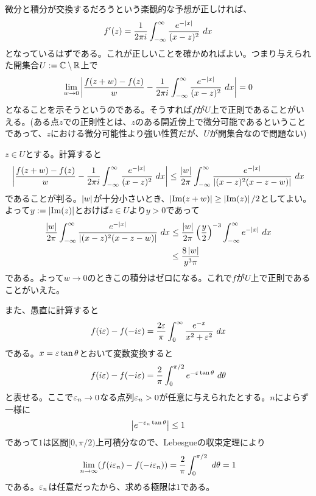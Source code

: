 \subsubsection{}%
\begin{sol}
微分と積分が交換するだろうという楽観的な予想が正しければ、
\[
f'(z) = \frac{1}{2 \pi i} \int_{- \infty}^{\infty} \frac{ e^{- \left \lvert x \right \rvert }  }{ (x - z )^2} \ dx
\]
となっているはずである。これが正しいことを確かめればよい。つまり与えられた開集合$U := {\mathbb C} \setminus {\mathbb R}$上で
\[
\lim_{w \to 0} \left \lvert  \frac{ f(z + w)-f(z) }{w} - \frac{1}{2 \pi i} \int_{- \infty}^{\infty} \frac{ e^{- \left \lvert x \right \rvert }  }{ (x - z )^2} \ dx  \right \rvert = 0
\]
となることを示そうというのである。そうすれば$f$が$U$上で正則であることがいえる。(ある点$z$での正則性とは、$z$のある開近傍上で微分可能であるということであって、$z$における微分可能性より強い性質だが、$U$が開集合なので問題ない)

$z \in U$とする。計算すると
\[
\left \lvert  \frac{ f(z + w)-f(z) }{w} - \frac{1}{2 \pi i} \int_{- \infty}^{\infty} \frac{ e^{- \left \lvert x \right \rvert }  }{ (x - z )^2} \ dx  \right \rvert \leq \frac{\left \lvert w \right \rvert }{2 \pi} \int_{- \infty}^{\infty} \frac{ e^{- \left \lvert x \right \rvert }  }{ \left \lvert (x - z )^2 (x-z-w)  \right \rvert  } \ dx
\]
であることが判る。$\left \lvert w \right \rvert$が十分小さいとき、$\left \lvert  \operatorname{Im}(z+w) \right \rvert \geq \left \lvert  \operatorname{Im}(z) \right \rvert  /2$としてよい。よって$y := \left \lvert  \operatorname{Im}(z) \right \rvert$とおけば$z \in U$より$y > 0$であって
\begin{align*}
  \frac{\left \lvert w \right \rvert }{2 \pi} \int_{- \infty}^{\infty} \frac{ e^{- \left \lvert x \right \rvert }  }{ \left \lvert (x - z )^2 (x-z-w)  \right \rvert  } \ dx &\leq    \frac{\left \lvert w \right \rvert }{2 \pi}  \left( \frac{y}{2} \right)^{-3}  \int_{- \infty}^{\infty} e^{- \left \lvert x \right \rvert }  \ dx \\
  &\leq \frac{ 8 \left \lvert w \right \rvert }{ y^3 \pi }
\end{align*}
である。よって$w \to 0$のときこの積分はゼロになる。これで$f$が$U$上で正則であることがいえた。

また、愚直に計算すると
\[
f(i \ve) - f(- i \ve) = \f{ 2\ve }{ \pi } \int_0^{\infty} \f{e^{-x}}{x^2 + \ve^2} \ dx
\]
である。$x = {\varepsilon} \tan {\theta}$とおいて変数変換すると
\[
f(i \ve) - f(- i \ve) = \f{ 2 }{ \pi } \int_0^{\pi /2} e^{ - \ve \tan \grt} \ d\grt
\]
と表せる。ここで${\varepsilon}_n \to 0$なる点列${\varepsilon}_n > 0$が任意に与えられたとする。$n$によらず一様に
\[
\left \lvert  e^{ - {\varepsilon}_n \tan {\theta}}  \right \rvert \leq 1
\]
であって$1$は区間$[0, \pi/2)$上可積分なので、Lebesgueの収束定理により
\[
\lim_{n \to \infty} (f(i {\varepsilon}_n) - f(- i {\varepsilon}_n)) = \frac{ 2 }{ \pi } \int_0^{\pi /2}  \ d{\theta} = 1
\]
である。${\varepsilon}_n$は任意だったから、求める極限は$1$である。
\end{sol}
